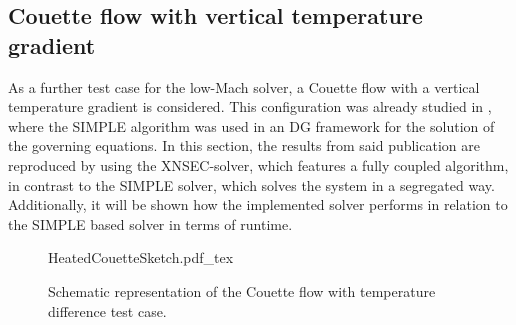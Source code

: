 \subsection{Couette flow with vertical temperature gradient} \label{ssec:CouetteFlowTempDiff}
As a further test case for the low-Mach solver, a Couette flow with a vertical temperature gradient is considered. This configuration was already studied in \cite{kleinHighorderDiscontinuousGalerkin2016}, where the SIMPLE algorithm was used in an DG framework for the solution of the governing equations. In this section, the results from said publication are reproduced by using the XNSEC-solver, which features a fully coupled algorithm, in contrast to the SIMPLE solver, which solves the system in a segregated way. Additionally, it will be shown how the implemented solver performs in relation to the SIMPLE based solver in terms of runtime.%
\begin{figure}[tb]
	\begin{center}
		\def\svgwidth{0.5\textwidth}
		{HeatedCouetteSketch.pdf_tex}
		\vspace{0.2cm}
		\caption{Schematic representation of the Couette flow with temperature difference test case.}\label{fig:CouetteTempDiff_scheme}
	\end{center}
\end{figure}%
